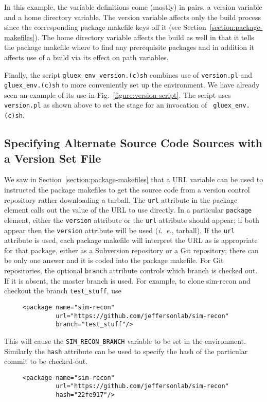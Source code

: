 \documentclass[12pt]{article}
\begin{document}
In this example, the variable definitions come (mostly) in pairs, a
version variable and a home directory variable. The version variable
affects only the build process since the corresponding package
makefile keys off it (see
Section~\ref{section:package-makefiles}). The home directory variable
affects the build as well in that it tells the package makefile where
to find any prerequisite packages and in addition it affects use of a
build via its effect on path variables.

Finally, the script {\tt gluex\_env\_version.(c)sh} combines use of
{\tt version.pl} and {\tt gluex\_env.(c)sh} to more conveniently set
up the environment. We have already seen an example of its use in
Fig.~\ref{figure:version-script}. The script uses {\tt version.pl} as
shown above to set the stage for an invocation of {\tt
  gluex\_env.(c)sh}.

\subsection{Specifying Alternate Source Code Sources with a Version Set File}

We saw in Section~\ref{section:package-makefiles} that a URL variable
can be used to instructed the package makefiles to get the source code
from a version control repository rather downloading a tarball. The
{\tt url} attribute in the package element calls out the value of the
URL to use directly. In a particular {\tt package} element, either the
{\tt version} attribute or the {\tt url} attribute should
appear; if both appear then the {\tt version} attribute will
be used ({\it i.~e.}, tarball).
If the {\tt url} attribute is used, each package makefile
will interpret the URL as is appropriate for that package, either as a
Subversion repository or a Git repository; there can be only one
answer and it is coded into the package makefile. For Git
repositories, the optional {\tt branch} attribute controls which
branch is checked out. If it is absent, the master branch is
used. For example, to clone sim-recon and checkout the branch
{\tt test\_stuff}, use
\begin{verbatim}
     <package name="sim-recon"
              url="https://github.com/jeffersonlab/sim-recon"
              branch="test_stuff"/>
\end{verbatim}
This will cause the {\tt SIM\_RECON\_BRANCH} variable to be set in
the environment. Similarly the {\tt hash} attribute can be used to
specify the hash of the particular commit to be checked-out.
\begin{verbatim}
     <package name="sim-recon"
              url="https://github.com/jeffersonlab/sim-recon"
              hash="22fe917"/>
\end{verbatim}
\end{document}
